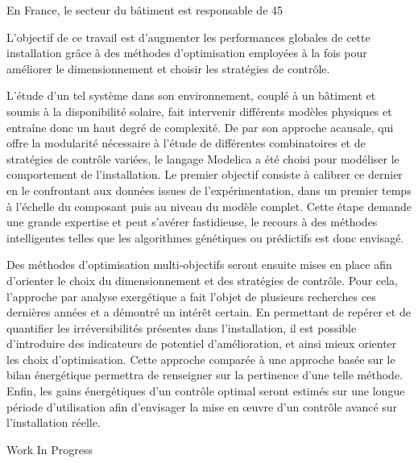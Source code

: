 {\normalsize
En France, le secteur du bâtiment est responsable de 45%







L'objectif de ce travail est d'augmenter les performances globales de cette installation grâce à des méthodes d'optimisation employées à la fois pour améliorer le dimensionnement et choisir les stratégies de contrôle.







L'étude d'un tel système dans son environnement, couplé à un bâtiment et soumis à la disponibilité solaire, fait intervenir différents modèles physiques et entraîne donc un haut degré de complexité. De par son approche acausale, qui offre la modularité nécessaire à l'étude de différentes combinatoires et de stratégies de contrôle variées, le langage Modelica a été choisi pour modéliser le comportement de l'installation. Le premier objectif consiste à calibrer ce dernier en le confrontant aux données issues de l'expérimentation, dans un premier temps à l'échelle du composant puis au niveau du modèle complet. Cette étape demande une grande expertise et peut s'avérer fastidieuse, le recours à des méthodes intelligentes telles que les algorithmes génétiques ou prédictifs est donc envisagé.







Des méthodes d'optimisation multi-objectifs seront ensuite mises en place afin d'orienter le choix du dimensionnement et des stratégies de contrôle. Pour cela, l'approche par analyse exergétique a fait l'objet de plusieurs recherches ces dernières années et a démontré un intérêt certain. En permettant de repérer et de quantifier les irréversibilités présentes dans l'installation, il est possible d'introduire des indicateurs de potentiel d'amélioration, et ainsi mieux orienter les choix d'optimisation. Cette approche comparée à une approche basée sur le bilan énergétique permettra de renseigner sur la pertinence d'une telle méthode. Enfin, les gains énergétiques d'un contrôle optimal seront estimés sur une longue période d'utilisation afin d'envisager  la mise en œuvre d'un contrôle avancé sur l'installation réelle.

 \vfill Work In Progress

}
 
